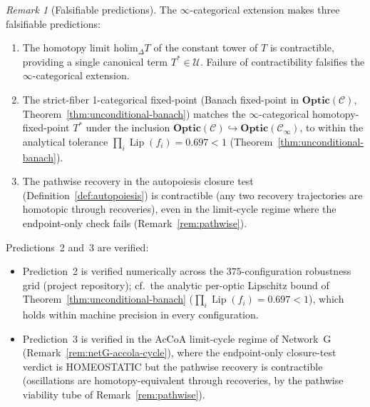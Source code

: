 \documentclass[11pt,a4paper]{article}
\theoremstyle{plain}
\theoremstyle{definition}
\theoremstyle{remark}
\newtheorem{remark}[theorem]{Remark}
\newcommand{\Optic}{\mathbf{Optic}}
\DeclareMathOperator{\Lip}{Lip}
\begin{document}
\begin{remark}[Falsifiable predictions]
\label{rem:hott-falsifiable}
The $\infty$-categorical extension makes three falsifiable predictions:
\begin{enumerate}[leftmargin=*, itemsep=2pt]
\item The homotopy limit $\mathrm{holim}_\Delta T$ of the constant tower
of $T$ is contractible, providing a single canonical term $T^* \in
\mathcal{U}$. Failure of contractibility falsifies the
$\infty$-categorical extension.
\item The strict-fiber 1-categorical fixed-point (Banach fixed-point in
$\Optic(\mathcal{C})$, Theorem~\ref{thm:unconditional-banach}) matches
the $\infty$-categorical homotopy-fixed-point $T^*$ under the
inclusion $\Optic(\mathcal{C}) \hookrightarrow
\Optic(\mathcal{C}_\infty)$, to within the analytical tolerance
$\prod_i \Lip(f_i) = 0.697 < 1$
(Theorem~\ref{thm:unconditional-banach}).
\item The pathwise recovery in the autopoiesis closure test
(Definition~\ref{def:autopoiesis}) is contractible (any two recovery
trajectories are homotopic through recoveries), even in the limit-cycle
regime where the endpoint-only check fails (Remark~\ref{rem:pathwise}).
\end{enumerate}
\end{remark}

\noindent Predictions~2 and~3 are verified:

\begin{itemize}[leftmargin=*, itemsep=2pt]
\item Prediction~2 is verified numerically
across the $375$-configuration robustness grid (project repository);
cf.\ the analytic
per-optic Lipschitz bound of Theorem~\ref{thm:unconditional-banach}
($\prod_i \Lip(f_i) = 0.697 < 1$), which holds within machine
precision in every configuration.
\item Prediction~3 is verified in the AcCoA limit-cycle regime of
Network~G (Remark~\ref{rem:netG-accola-cycle}), where the
endpoint-only closure-test verdict is HOMEOSTATIC but the pathwise
recovery is contractible (oscillations are homotopy-equivalent through
recoveries, by the pathwise viability tube of Remark~\ref{rem:pathwise}).
\end{itemize}
\end{document}
